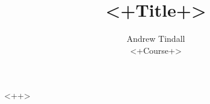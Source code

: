\documentclass[12pt]{article}
\begin{document}
 
 
\title{<+Title+>}
\author{Andrew Tindall\\
<+Course+>}
 
\maketitle
<++>
\end{document}
